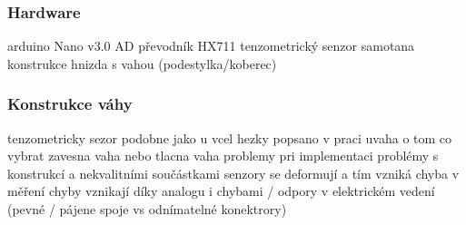 \subsubsection{Hardware}
arduino Nano v3.0
AD převodník HX711
tenzometrický senzor
samotana konstrukce hnizda s vahou (podestylka/koberec)

\subsubsection{Konstrukce váhy}
tenzometricky sezor podobne jako u vcel
hezky popsano v praci
uvaha o tom co vybrat zavesna vaha nebo tlacna vaha
problemy pri implementaci
problémy s konstrukcí a nekvalitními součástkami
senzory se deformují a tím vzniká chyba v měření
chyby vznikají díky analogu i chybami / odpory v elektrickém
vedení (pevné / pájene spoje vs odnímatelné konektrory)

